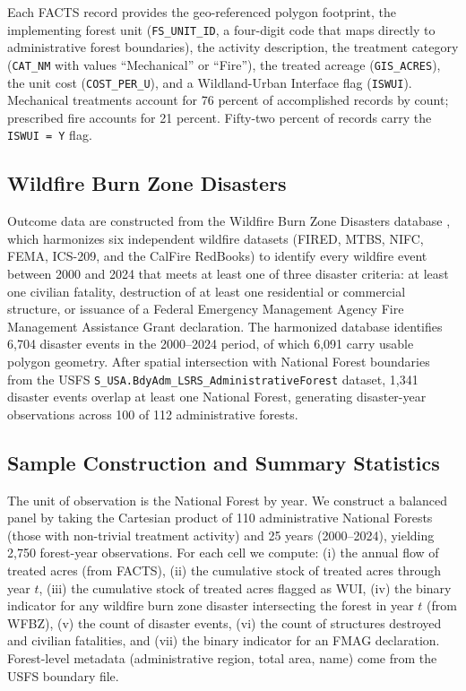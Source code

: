 \documentclass[12pt, letterpaper]{article}
\begin{document}
Each FACTS record provides the geo-referenced polygon footprint, the implementing forest unit (\texttt{FS\_UNIT\_ID}, a four-digit code that maps directly to administrative forest boundaries), the activity description, the treatment category (\texttt{CAT\_NM} with values ``Mechanical'' or ``Fire''), the treated acreage (\texttt{GIS\_ACRES}), the unit cost (\texttt{COST\_PER\_U}), and a Wildland-Urban Interface flag (\texttt{ISWUI}). Mechanical treatments account for 76 percent of accomplished records by count; prescribed fire accounts for 21 percent. Fifty-two percent of records carry the \texttt{ISWUI = Y} flag.

\subsection{Wildfire Burn Zone Disasters}

Outcome data are constructed from the Wildfire Burn Zone Disasters database \citep{wilner2025}, which harmonizes six independent wildfire datasets (FIRED, MTBS, NIFC, FEMA, ICS-209, and the CalFire RedBooks) to identify every wildfire event between 2000 and 2024 that meets at least one of three disaster criteria: at least one civilian fatality, destruction of at least one residential or commercial structure, or issuance of a Federal Emergency Management Agency Fire Management Assistance Grant declaration. The harmonized database identifies 6{,}704 disaster events in the 2000--2024 period, of which 6{,}091 carry usable polygon geometry. After spatial intersection with National Forest boundaries from the USFS \texttt{S\_USA.BdyAdm\_LSRS\_AdministrativeForest} dataset, 1{,}341 disaster events overlap at least one National Forest, generating disaster-year observations across 100 of 112 administrative forests.

\subsection{Sample Construction and Summary Statistics}

The unit of observation is the National Forest by year. We construct a balanced panel by taking the Cartesian product of 110 administrative National Forests (those with non-trivial treatment activity) and 25 years (2000--2024), yielding 2{,}750 forest-year observations. For each cell we compute: (i) the annual flow of treated acres (from FACTS), (ii) the cumulative stock of treated acres through year $t$, (iii) the cumulative stock of treated acres flagged as WUI, (iv) the binary indicator for any wildfire burn zone disaster intersecting the forest in year $t$ (from WFBZ), (v) the count of disaster events, (vi) the count of structures destroyed and civilian fatalities, and (vii) the binary indicator for an FMAG declaration. Forest-level metadata (administrative region, total area, name) come from the USFS boundary file.
\end{document}

